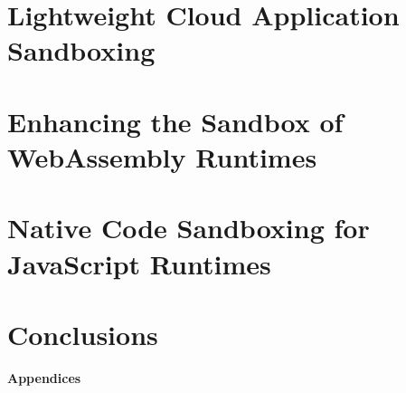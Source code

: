 \documentclass[12pt,a4paper,twoside,openright,oldfontcommands]{memoir}
\renewcommand*{\chapnumfont}{\Large\bfseries}
\renewcommand*{\chaptitlefont}{\Large\bfseries}
\begin{document}
\chapter{Lightweight Cloud Application Sandboxing}
\label{chap:dmng}
\pagestyle{afterintro}


\chapter{Enhancing the Sandbox of WebAssembly Runtimes}
\label{chap:wasm}
\pagestyle{afterintro}


\chapter{Native Code Sandboxing for JavaScript Runtimes}
\label{chap:natisand}
\pagestyle{afterintro}


\chapter{Conclusions} %
\pagestyle{conclusions}
\label{chap:conclusions}

\cleardoublepage


\thispagestyle{empty}
\renewcommand*{\thechapter}{\arabic{chapter}}
\renewcommand{\appendixname}{{\Large\bfseries Appendix}}
\renewcommand*{\chapnumfont}{\Large\bfseries}
\renewcommand*{\chaptitlefont}{\large\bfseries}
\renewcommand{\afterchapternum}{\\\medskip}

\begin{center}
  \bfseries
  \Large
  Appendices
\end{center}
\cleardoublepage

\appendix
\pagestyle{appendices}


\cleardoublepage


\pagestyle{afterintro}
\listoffigures*
{}
\cleardoublepage

\listoftables*
{}
\cleardoublepage


\pagestyle{afterintro}


\end{document}
